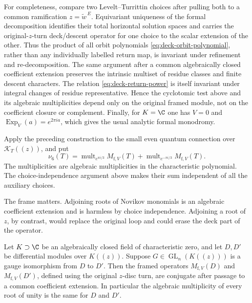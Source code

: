 For completeness, compare two Levelt--Turrittin choices after pulling both to
a common ramification \(z=\widetilde w^{\,E}\).  Equivariant uniqueness of the formal
decomposition identifies their total horizontal solution spaces and carries
the original-\(z\)-turn deck/descent operator for one choice to the scalar
extension of the other.  Thus the product of all orbit polynomials
\eqref{eq:deck-orbit-polynomial}, rather than any individually labelled
return map, is invariant under refinement and re-decomposition.  The same
argument after a common algebraically closed coefficient extension preserves
the intrinsic multiset of residue classes and finite descent characters.
The relation \eqref{eq:deck-return-power} is itself invariant under integral
changes of residue representative.  Hence the cyclotomic test above and its
algebraic multiplicities depend only on the original framed module, not on
the coefficient closure or complement.  Finally, for \(K=\C\) one has
\(V=0\) and
\(\operatorname{Exp}_V(a)=e^{2\pi i a}\), which gives the usual analytic
formal monodromy.

\begin{definition}
\label{def:framed-sixth-multiplicity}
Apply the preceding construction to the small even quantum connection over
\(\mathcal K_T((z))\), and put
\[
 \nu_6(T)=
 \operatorname{mult}_{e^{\pi i/3}}M_{\mathrm f,V}(T)+
 \operatorname{mult}_{e^{-\pi i/3}}M_{\mathrm f,V}(T).
\]
The multiplicities are algebraic multiplicities in the characteristic
polynomial.  The choice-independence argument above makes their sum independent
of all the auxiliary choices.
\end{definition}

The frame matters.  Adjoining roots of Novikov monomials is an algebraic
coefficient extension and is harmless by choice independence.  Adjoining a root of
\(z\), by contrast, would replace the original loop and could erase the deck
part of the operator.

\begin{lemmaOneA}
Let \(K\supset\C\) be an algebraically closed field of characteristic zero,
and let \(D,D'\) be differential modules over \(K(\!(z)\!)\).  Suppose
\(G\in\operatorname{GL}_n(K(\!(z)\!))\) is a gauge isomorphism from \(D\) to
\(D'\).  Then the framed operators \(M_{\mathrm f,V}(D)\) and
\(M_{\mathrm f,V}(D')\), defined using the original \(z\)-disc turn, are
conjugate after passage to a common coefficient extension.  In particular the
algebraic multiplicity of every root of unity is the same for \(D\) and
\(D'\).
\end{lemmaOneA}

